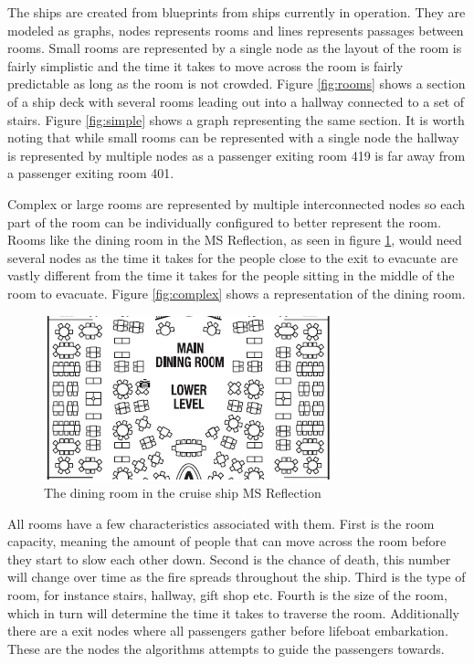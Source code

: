 The ships are created from blueprints from ships currently in operation. They are modeled as graphs, nodes represents rooms and lines represents passages between rooms. Small rooms are represented by a single node as the layout of the room is fairly simplistic and the time it takes to move across the room is fairly predictable as long as the room is not crowded. Figure \ref{fig:rooms} shows a section of a ship deck with several rooms leading out into a hallway connected to a set of stairs. Figure \ref{fig:simple} shows a graph representing the same section. It is worth noting that while small rooms can be represented with a single node the hallway is represented by multiple nodes as a passenger exiting room 419 is far away from a passenger exiting room 401.

Complex or large rooms are represented by multiple interconnected nodes so each part of the room can be individually configured to better represent the room. Rooms like the dining room in the MS Reflection, as seen in figure \ref{fig:dining}, would need several nodes as the time it takes for the people close to the exit to evacuate are vastly different from the time it takes for the people sitting in the middle of the room to evacuate. Figure \ref{fig:complex} shows a representation of the dining room. 

\begin{figure} [h]
\centering
\includegraphics{images/Dining.png}
\caption{The dining room in the cruise ship MS Reflection}
\label{fig:dining}
\end{figure}

All rooms have a few characteristics associated with them. First is the room capacity, meaning the amount of people that can move across the room before they start to slow each other down. Second is the chance of death, this number will change over time as the fire spreads throughout the ship. Third is the type of room, for instance stairs, hallway, gift shop etc. Fourth is the size of the room, which in turn will determine the time it takes to traverse the room. Additionally there are a exit nodes where all passengers gather before lifeboat embarkation. These are the nodes the algorithms attempts to guide the passengers towards.

